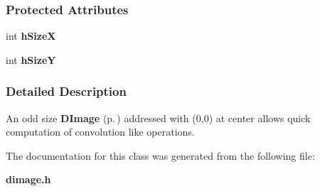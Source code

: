 \subsubsection*{Protected Attributes}
\begin{CompactItemize}
\item 
{}
int {\bf h\-Size\-X}\label{class_kernel_n0}

\item 
{}
int {\bf h\-Size\-Y}\label{class_kernel_n1}

\end{CompactItemize}


\subsubsection{Detailed Description}
An odd size {\bf DImage} {\rm (p.\,\pageref{class_dimage})} addressed with (0,0) at center allows quick computation of convolution like operations.



The documentation for this class was generated from the following file:\begin{CompactItemize}
\item 
{\bf dimage.h}\end{CompactItemize}
